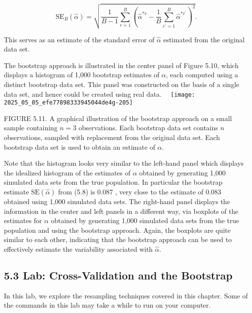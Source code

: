 \documentclass[10pt]{article}
\begin{document}
\begin{equation*}
\mathrm{SE}_{B}(\hat{\alpha})=\sqrt{\frac{1}{B-1} \sum_{r=1}^{B}\left(\hat{\alpha}^{* r}-\frac{1}{B} \sum_{r^{\prime}=1}^{B} \hat{\alpha}^{* r^{\prime}}\right)^{2}} . \tag{5.8}
\end{equation*}


This serves as an estimate of the standard error of $\hat{\alpha}$ estimated from the original data set.

The bootstrap approach is illustrated in the center panel of Figure 5.10, which displays a histogram of 1,000 bootstrap estimates of $\alpha$, each computed using a distinct bootstrap data set. This panel was constructed on the basis of a single data set, and hence could be created using real data.\
\
\texttt{[image: 2025\_05\_05\_efe77898333945044de4g-205]}

FIGURE 5.11. A graphical illustration of the bootstrap approach on a small sample containing $n=3$ observations. Each bootstrap data set contains $n$ observations, sampled with replacement from the original data set. Each bootstrap data set is used to obtain an estimate of $\alpha$.

Note that the histogram looks very similar to the left-hand panel which displays the idealized histogram of the estimates of $\alpha$ obtained by generating 1,000 simulated data sets from the true population. In particular the bootstrap estimate $\mathrm{SE}(\hat{\alpha})$ from (5.8) is 0.087 , very close to the estimate of 0.083 obtained using 1,000 simulated data sets. The right-hand panel displays the information in the center and left panels in a different way, via boxplots of the estimates for $\alpha$ obtained by generating 1,000 simulated data sets from the true population and using the bootstrap approach. Again, the boxplots are quite similar to each other, indicating that the bootstrap approach can be used to effectively estimate the variability associated with $\hat{\alpha}$.

\subsection*{5.3 Lab: Cross-Validation and the Bootstrap}
In this lab, we explore the resampling techniques covered in this chapter. Some of the commands in this lab may take a while to run on your computer.

\end{document}
